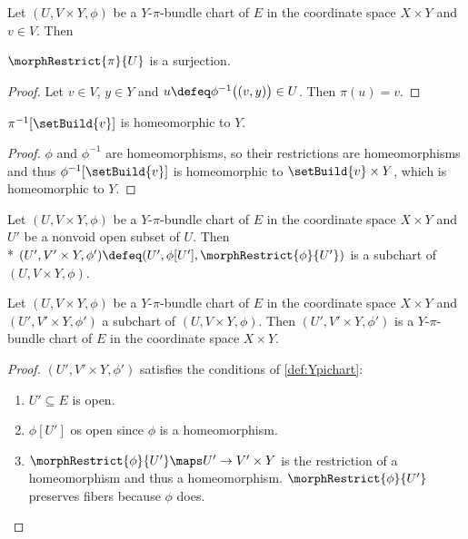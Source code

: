 \documentclass{article}
\begin{document}
\begin{lemma}
\label{def:piepi}
Let $(U, V \times Y, \phi)$ be a $Y$-$\pi$-bundle chart of $E$ in the
coordinate space $X \times Y$ and $v \in V$. Then

$\morphRestrict{\pi}{U}$ is a surjection.
\begin{proof}
Let $v \in V$, $y \in Y$ and
$u \defeq \phi^{-1} \bigl ( (v,y) \bigr ) \in U$. Then $\pi(u) = v$.
\end{proof}
$\pi^{-1}[\setBuild{v}]$ is homeomorphic to $Y$.
\begin{proof}
$\phi$ and $\phi^{-1}$ are homeomorphisms, so their restrictions are
homeomorphisms and thus $\phi^{-1}[\setBuild{v}]$ is homeomorphic to
$\setBuild{v} \times Y$, which is homeomorphic to $Y$.
\end{proof}
\end{lemma}

\begin{definition}[$Y$-$\pi$ subcharts]
\label{def:Ypisub}
Let $(U, V \times Y, \phi)$ be a $Y$-$\pi$-bundle chart of $E$ in the
coordinate space $X \times Y$ and $U'$ be a nonvoid open subset of $U$.
Then \\*
$(U', V' \times Y, \phi') \defeq (U', \phi[U'], \morphRestrict{\phi}{U'})$
is a subchart of $(U, V \times Y, \phi)$.
\end{definition}

\begin{lemma}[$Y$-$\pi$ subcharts]
Let $(U, V \times Y, \phi)$ be a $Y$-$\pi$-bundle chart of $E$ in the
coordinate space $X \times Y$ and $(U', V' \times Y, \phi')$ a subchart
of $(U, V \times Y, \phi)$. Then $(U', V' \times Y, \phi')$ is a
$Y$-$\pi$-bundle chart of $E$ in the coordinate space $X \times Y$.
\begin{proof}
$(U', V' \times Y, \phi')$ satisfies the conditions of \cref{def:Ypichart}:
\begin{enumerate}
\item $U' \subseteq E$ is open.
\item $\phi[U']$ os open since $\phi$ is a homeomorphism.
\item $\morphRestrict{\phi}{U'} \maps U' \to V' \times Y$ is the
restriction of a homeomorphism and thus a homeomorphism.
$\morphRestrict{\phi}{U'}$ preserves fibers because $\phi$ does.
\end{enumerate}
\end{proof}
\end{lemma}
\end{document}
